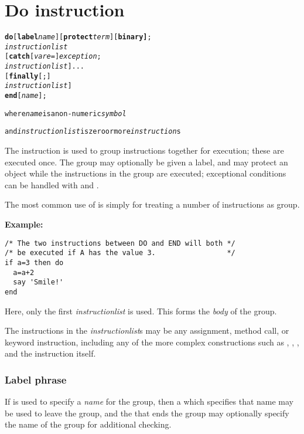 \chapter{Do instruction}\label{refdo}
\begin{shaded}
\begin{alltt}
\textbf{do} [\textbf{label} \emph{name}] [\textbf{protect} \emph{term}] [\textbf{binary]};
        \emph{instructionlist}
    [\textbf{catch} [\emph{vare} =] \emph{exception};
        \emph{instructionlist}]...
    [\textbf{finally}[;]
        \emph{instructionlist}]
\textbf{end} [\emph{name}];

where \emph{name} is a non-numeric \emph{symbol}

and \emph{instructionlist} is zero or more \emph{instruction}s
\end{alltt}
\end{shaded}
 The  instruction is used to group instructions together for
execution; these are executed once.
The group may optionally be given a label, and may protect an object
while the instructions in the group are executed; exceptional conditions
can be handled with  and .
 
The most common use of  is simply for treating a number of
instructions as group.

\textbf{Example:}
\begin{lstlisting}
/* The two instructions between DO and END will both */
/* be executed if A has the value 3.                 */
if a=3 then do
  a=a+2
  say 'Smile!'
end
\end{lstlisting}
Here, only the first \emph{instructionlist} is used.
This forms the \emph{body} of the group.
 
The instructions in the \emph{instructionlist}s may be any assignment,
method call, or keyword instruction, including any of the more complex
constructions such as , , , and
the  instruction itself.
\subsection{Label phrase}
 
If  is used to specify a \emph{name} for the group,
then a  which specifies that name may be used to leave the
group, and the  that ends the group may optionally specify
the name of the group for additional checking.

